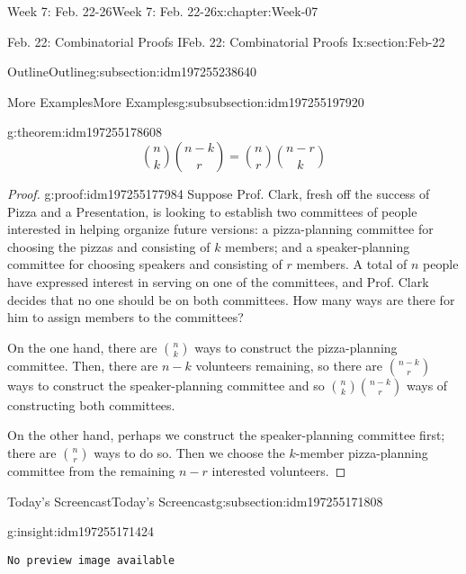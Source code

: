 \documentclass[oneside,10pt,]{book}
\newcommand{\mono}[1]{\texttt{#1}}
\numberwithin{equation}{section}
\newlength{\qrsize}
\newlength{\previewwidth}
\begin{document}
\begin{chapterptx}{Week 7: Feb. 22-26}{}{Week 7: Feb. 22-26}{}{}{x:chapter:Week-07}
\begin{sectionptx}{Feb. 22: Combinatorial Proofs I}{}{Feb. 22: Combinatorial Proofs I}{}{}{x:section:Feb-22}
\begin{subsectionptx}{Outline}{}{Outline}{}{}{g:subsection:idm197255238640}
\begin{subsubsectionptx}{More Examples}{}{More Examples}{}{}{g:subsubsection:idm197255197920}
\begin{theorem}{}{}{g:theorem:idm197255178608}
\begin{equation*}
\binom{n}{k} \binom{n-k}{r} = \binom{n}{r} \binom{n-r}{k}
\end{equation*}
\end{theorem}
\begin{proof}{}{g:proof:idm197255177984}
Suppose Prof. Clark, fresh off the success of Pizza and a Presentation, is looking to establish two committees of people interested in helping organize future versions: a pizza-planning committee for choosing the pizzas and consisting of \(k\) members; and a speaker-planning committee for choosing speakers and consisting of \(r\) members. A total of \(n\) people have expressed interest in serving on one of the committees, and Prof. Clark decides that no one should be on both committees. How many ways are there for him to assign members to the committees?%
\par
On the one hand, there are \(\binom{n}{k}\) ways to construct the pizza-planning committee. Then, there are \(n-k\) volunteers remaining, so there are \(\binom{n-k}{r}\) ways to construct the speaker-planning committee and so \(\binom{n}{k} \binom{n-k}{r}\) ways of constructing both committees.%
\par
On the other hand, perhaps we construct the speaker-planning committee first; there are \(\binom{n}{r}\) ways to do so. Then we choose the \(k\)-member pizza-planning committee from the remaining \(n-r\) interested volunteers.%
\end{proof}
\end{subsubsectionptx}
\end{subsectionptx}
%
%
\typeout{************************************************}
\typeout{************************************************}
%
\begin{subsectionptx}{Today's Screencast}{}{Today's Screencast}{}{}{g:subsection:idm197255171808}
\begin{insight}{}{g:insight:idm197255171424}%
\setlength{\qrsize}{9em}
\setlength{\previewwidth}{\linewidth}
\addtolength{\previewwidth}{-\qrsize}
\begin{tcbraster}[raster columns=2, raster column skip=1pt, raster halign=center, raster force size=false, raster left skip=0pt, raster right skip=0pt]%
\begin{tcolorbox}[previewstyle, width=\previewwidth]%
\mono{No preview image available}%
\end{tcolorbox}%
\begin{tcolorbox}[qrstyle]%
[QR LINK]\end{tcolorbox}%

\end{tcbraster}
\end{insight}
\end{subsectionptx}
\end{sectionptx}
\end{chapterptx}
\end{document}
